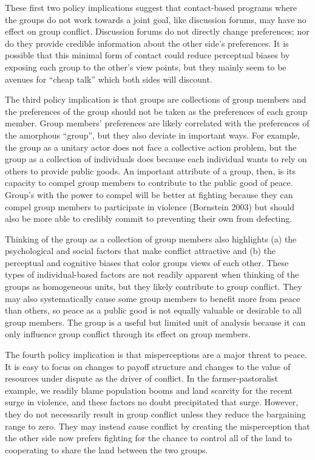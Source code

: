 \documentclass[11pt]{article}
\begin{document}
These first two policy implications suggest that contact-based programs
where the groups do not work towards a joint goal, like discussion
forums, may have no effect on group conflict. Discussion forums do not
directly change preferences; nor do they provide credible information
about the other side's preferences. It is possible that this minimal
form of contact could reduce perceptual biases by exposing each group to
the other's view points, but they mainly seem to be avenues for ``cheap
talk'' which both sides will discount.

The third policy implication is that groups are collections of group
members and the preferences of the group should not be taken as the
preferences of each group member. Group members' preferences are likely
correlated with the preferences of the amorphous ``group'', but they
also deviate in important ways. For example, the group as a unitary
actor does not face a collective action problem, but the group as a
collection of individuals does because each individual wants to rely on
others to provide public goods. An important attribute of a group, then,
is its capacity to compel group members to contribute to the public good
of peace. Group's with the power to compel will be better at fighting
because they can compel group members to participate in violence
(Bornstein 2003) but should also be more able to credibly commit to
preventing their own from defecting.

Thinking of the group as a collection of group members also highlights
(a) the psychological and social factors that make conflict attractive
and (b) the perceptual and cognitive biases that color groups views of
each other. These types of individual-based factors are not readily
apparent when thinking of the groups as homogeneous units, but they
likely contribute to group conflict. They may also systematically cause
some group members to benefit more from peace than others, so peace as a
public good is not equally valuable or desirable to all group members.
The group is a useful but limited unit of analysis because it can only
influence group conflict through its effect on group members.

The fourth policy implication is that misperceptions are a major threat
to peace. It is easy to focus on changes to payoff structure and changes
to the value of resources under dispute as the driver of conflict. In
the farmer-pastoralist example, we readily blame population booms and
land scarcity for the recent surge in violence, and these factors no
doubt precipitated that surge. However, they do not necessarily result
in group conflict unless they reduce the bargaining range to zero. They
may instead cause conflict by creating the misperception that the other
side now prefers fighting for the chance to control all of the land to
cooperating to share the land between the two groups.
\end{document}
